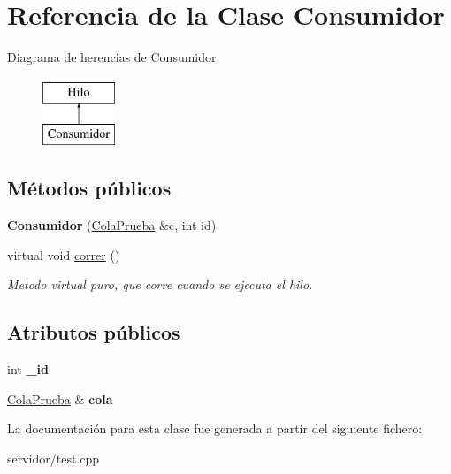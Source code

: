 \hypertarget{classConsumidor}{\section{\-Referencia de la \-Clase \-Consumidor}
\label{classConsumidor}
}
\-Diagrama de herencias de \-Consumidor\begin{figure}[H]
\begin{center}
\leavevmode
\includegraphics[height=2.000000cm]{classConsumidor}
\end{center}
\end{figure}
\subsection*{\-Métodos públicos}
\begin{DoxyCompactItemize}
\item 
\hypertarget{classConsumidor_af4e98de3f07fe279bef37803d60966c7}{{\bfseries \-Consumidor} (\hyperlink{classBLQueue}{\-Cola\-Prueba} \&c, int id)}\label{classConsumidor_af4e98de3f07fe279bef37803d60966c7}

\item 
\hypertarget{classConsumidor_a24aa380e7122221c06549d1eb59f1c4e}{virtual void \hyperlink{classConsumidor_a24aa380e7122221c06549d1eb59f1c4e}{correr} ()}\label{classConsumidor_a24aa380e7122221c06549d1eb59f1c4e}

\begin{DoxyCompactList}\small\item\em \-Metodo virtual puro, que corre cuando se ejecuta el hilo. \end{DoxyCompactList}\end{DoxyCompactItemize}
\subsection*{\-Atributos públicos}
\begin{DoxyCompactItemize}
\item 
\hypertarget{classConsumidor_a9a6fd3586c1b4ca2063557a05c606c77}{int {\bfseries \-\_\-id}}\label{classConsumidor_a9a6fd3586c1b4ca2063557a05c606c77}

\item 
\hypertarget{classConsumidor_a7f4e73a75d0b0aa8c82ce1f696cc794e}{\hyperlink{classBLQueue}{\-Cola\-Prueba} \& {\bfseries cola}}\label{classConsumidor_a7f4e73a75d0b0aa8c82ce1f696cc794e}

\end{DoxyCompactItemize}


\-La documentación para esta clase fue generada a partir del siguiente fichero\-:\begin{DoxyCompactItemize}
\item 
servidor/test.\-cpp\end{DoxyCompactItemize}
